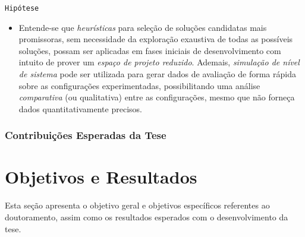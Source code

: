 \documentclass[tese-proposta,nocipinfo]{texufpel}
\begin{document}
\texttt{Hipótese}
\begin{itemize}
\item Entende-se que \textit{heurísticas} para seleção de soluções candidatas mais promissoras, sem necessidade da exploração exaustiva de todas as possíveis soluções, possam ser aplicadas em fases iniciais de desenvolvimento com intuito de prover um \textit{espaço de projeto reduzido}. Ademais, \textit{simulação de nível de sistema} pode ser utilizada para gerar dados de avaliação de forma rápida sobre as configurações experimentadas, possibilitando uma análise \textit{comparativa} (ou qualitativa) entre as configurações, mesmo que não forneça dados quantitativamente precisos.
\end{itemize}

\subsection{Contribuições Esperadas da Tese}







\chapter{Objetivos e Resultados}\label{Sec:Objetivos_Resultados}
Esta seção apresenta o objetivo geral e objetivos específicos referentes ao doutoramento, assim como os resultados esperados com o desenvolvimento da tese.
\end{document}
